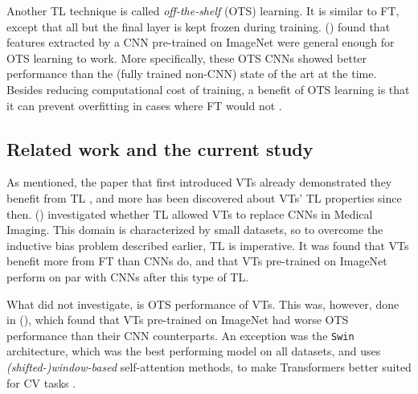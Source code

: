 
Another TL technique is called \textit{off-the-shelf} (OTS) learning. It is similar to FT, except that all but the final layer is kept frozen during training. \citeauthor{sharif2014cnn} (\citeyear{sharif2014cnn}) found that features extracted by a CNN pre-trained on ImageNet were general enough for OTS learning to work. More specifically, these OTS CNNs showed better performance than the (fully trained non-CNN) state of the art at the time. Besides reducing computational cost of training, a benefit of OTS learning is that it can prevent overfitting in cases where FT would not \citep{yosinski2014transferable}.


\subsection{Related work and the current study} \label{related_work}
As mentioned, the paper that first introduced VTs already demonstrated they benefit from TL \citep{dosovitskiy2020image}, and more has been discovered about VTs' TL properties since then. \citeauthor{matsoukas2021time} (\citeyear{matsoukas2021time}) investigated whether TL allowed VTs to replace CNNs in Medical Imaging. This domain is characterized by small datasets, so to overcome the inductive bias problem described earlier, TL is imperative. It was found that VTs benefit more from FT than CNNs do, and that VTs pre-trained on ImageNet perform on par with CNNs after this type of TL.

What \citeauthor{matsoukas2021time} did not investigate, is OTS performance of VTs. This was, however, done in \citeauthor{zhou2021convnets} (\citeyear{zhou2021convnets}), which found that VTs pre-trained on ImageNet had worse OTS performance than their CNN counterparts. An exception was the \texttt{Swin} architecture, which was the best performing model on all datasets, and uses \textit{(shifted-)window-based} self-attention methods, to make Transformers better suited for CV tasks \citep{liu2021swin}.

